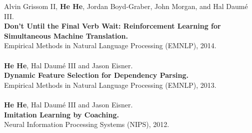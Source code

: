 \documentclass[a4paper,11pt]{article}
\begin{document}
Alvin Grissom II, {\bf He He}, Jordan Boyd-Graber, John Morgan, and Hal Daum\'e III. \\
{\bf Don't Until the Final Verb Wait: Reinforcement Learning for Simultaneous Machine Translation.}\\
Empirical Methods in Natural Language Processing (EMNLP), 2014.\\
\\
{\bf He He}, Hal Daum\'e III and Jason Eisner.\\
{\bf Dynamic Feature Selection for Dependency Parsing.}\\ 
Empirical Methods in Natural Language Processing (EMNLP), 2013.\\
\\
{\bf He He}, Hal Daum\'e III and Jason Eisner.\\
{\bf Imitation Learning by Coaching.}\\ 
Neural Information Processing Systems (NIPS), 2012.\\
\\
\end{document}
